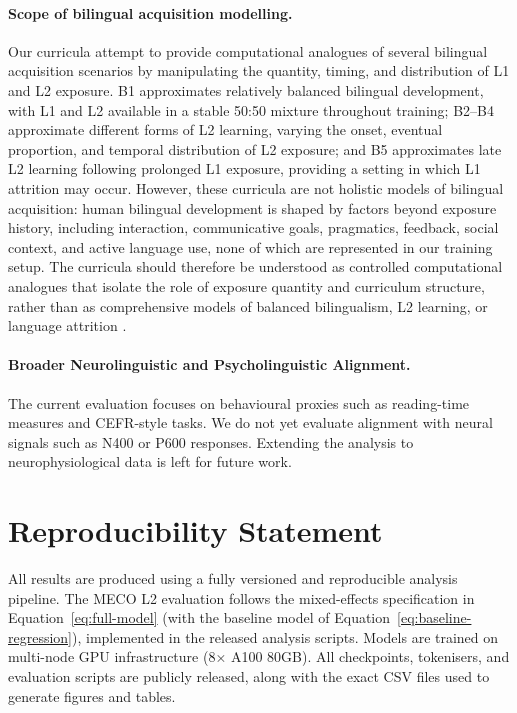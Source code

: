 \documentclass[11pt]{article}
\begin{document}
\paragraph{Scope of bilingual acquisition modelling.} Our curricula attempt to provide computational analogues of several bilingual acquisition scenarios by manipulating the quantity, timing, and distribution of L1 and L2 exposure. B1 approximates relatively balanced bilingual development, with L1 and L2 available in a stable 50:50 mixture throughout training; B2--B4 approximate different forms of L2 learning, varying the onset, eventual proportion, and temporal distribution of L2 exposure; and B5 approximates late L2 learning following prolonged L1 exposure, providing a setting in which L1 attrition may occur. However, these curricula are not holistic models of bilingual acquisition: human bilingual development is shaped by factors beyond exposure history, including interaction, communicative goals, pragmatics, feedback, social context, and active language use, none of which are represented in our training setup. The curricula should therefore be understood as controlled computational analogues that isolate the role of exposure quantity and curriculum structure, rather than as comprehensive models of balanced bilingualism, L2 learning, or language attrition \citep{barbenel-etal-2026-l1}.

\paragraph{Broader Neurolinguistic and Psycholinguistic Alignment.} The current evaluation focuses on behavioural proxies such as reading-time measures and CEFR-style tasks. We do not yet evaluate alignment with neural signals such as N400 or P600 responses. Extending the analysis to neurophysiological data is left for future work.

\section{Reproducibility Statement}\label{sec:reproducibility}

All results are produced using a fully versioned and reproducible analysis pipeline. The MECO L2 evaluation follows the mixed-effects specification in Equation~\ref{eq:full-model} (with the baseline model of Equation~\ref{eq:baseline-regression}), implemented in the released analysis scripts. Models are trained on multi-node GPU infrastructure (8× A100 80GB). All checkpoints, tokenisers, and evaluation scripts are publicly released, along with the exact CSV files used to generate figures and tables. 
\end{document}

